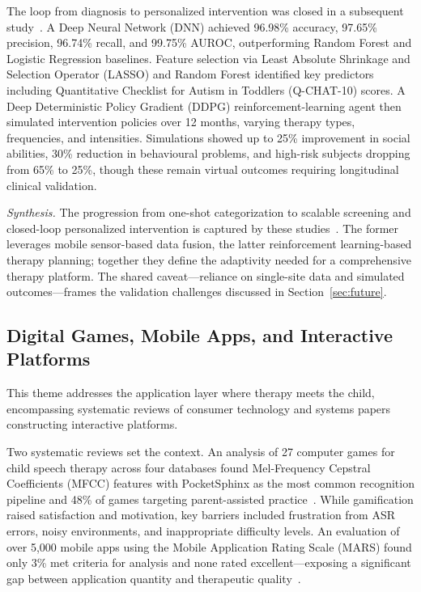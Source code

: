 \documentclass[conference]{IEEEtran}
\begin{document}
The loop from diagnosis to personalized intervention was closed in a subsequent study~\cite{ref11}. A Deep Neural Network (DNN) achieved 96.98\% accuracy, 97.65\% precision, 96.74\% recall, and 99.75\% AUROC, outperforming Random Forest and Logistic Regression baselines. Feature selection via Least Absolute Shrinkage and Selection Operator (LASSO) and Random Forest identified key predictors including Quantitative Checklist for Autism in Toddlers (Q-CHAT-10) scores. A Deep Deterministic Policy Gradient (DDPG) reinforcement-learning agent then simulated intervention policies over 12 months, varying therapy types, frequencies, and intensities. Simulations showed up to 25\% improvement in social abilities, 30\% reduction in behavioural problems, and high-risk subjects dropping from 65\% to 25\%, though these remain virtual outcomes requiring longitudinal clinical validation.

\emph{Synthesis.} The progression from one-shot categorization to scalable screening and closed-loop personalized intervention is captured by these studies~\cite{ref10,ref11}. The former leverages mobile sensor-based data fusion, the latter reinforcement learning-based therapy planning; together they define the adaptivity needed for a comprehensive therapy platform. The shared caveat---reliance on single-site data and simulated outcomes---frames the validation challenges discussed in Section~\ref{sec:future}.

\subsection{Digital Games, Mobile Apps, and Interactive Platforms}

This theme addresses the application layer where therapy meets the child, encompassing systematic reviews of consumer technology and systems papers constructing interactive platforms.

Two systematic reviews set the context. An analysis of 27 computer games for child speech therapy across four databases found Mel-Frequency Cepstral Coefficients (MFCC) features with PocketSphinx as the most common recognition pipeline and 48\% of games targeting parent-assisted practice~\cite{ref12}. While gamification raised satisfaction and motivation, key barriers included frustration from ASR errors, noisy environments, and inappropriate difficulty levels. An evaluation of over 5,000 mobile apps using the Mobile Application Rating Scale (MARS) found only 3\% met criteria for analysis and none rated excellent---exposing a significant gap between application quantity and therapeutic quality~\cite{ref13}.
\end{document}
